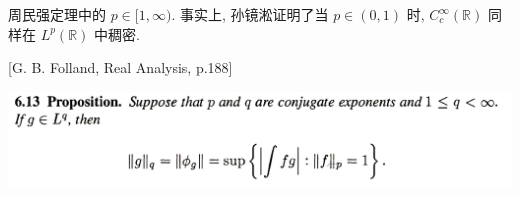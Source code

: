 \documentclass[a4paper,11pt]{article}
\theoremstyle{definition}
\begin{document}
\begin{CJK*}{UTF8}{gbsn}
周民强定理中的 $ p \in [1, \infty) $. 
事实上, 孙镜淞证明了当 $ p \in (0, 1) $ 时,
$ C_c^\infty(\mathbb{R}) $ 同样在 $ L^p(\mathbb{R}) $ 中稠密.


\begin{framed}
\setlength{\parindent}{0pt}
[G. B. Folland, Real Analysis, p.188]
\vspace{0.1cm}

\includegraphics[width=\textwidth]{picture/dual.PNG}
\end{framed}

\end{CJK*}
\end{document}
